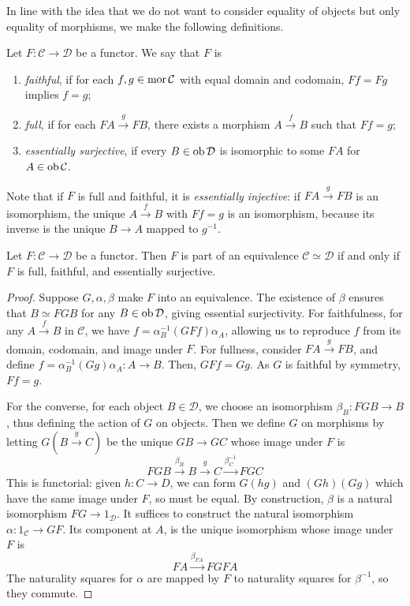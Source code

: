 In line with the idea that we do not want to consider equality of objects but only equality of morphisms, we make the following definitions.
\begin{definition}
    Let \( F : \mathcal C \to \mathcal D \) be a functor.
    We say that \( F \) is
    \begin{enumerate}
        \item \emph{faithful}, if for each \( f, g \in \operatorname{mor} \mathcal C \) with equal domain and codomain, \( Ff = Fg \) implies \( f = g \);
        \item \emph{full}, if for each \( FA \xrightarrow g FB \), there exists a morphism \( A \xrightarrow f B \) such that \( Ff = g \);
        \item \emph{essentially surjective}, if every \( B \in \operatorname{ob} \mathcal D \) is isomorphic to some \( FA \) for \( A \in \operatorname{ob} \mathcal C \).
    \end{enumerate}
\end{definition}
Note that if \( F \) is full and faithful, it is \emph{essentially injective}: if \( FA \xrightarrow g FB \) is an isomorphism, the unique \( A \xrightarrow f B \) with \( Ff = g \) is an isomorphism, because its inverse is the unique \( B \to A \) mapped to \( g^{-1} \).
\begin{lemma}
    Let \( F : \mathcal C \to \mathcal D \) be a functor.
    Then \( F \) is part of an equivalence \( \mathcal C \simeq \mathcal D \) if and only if \( F \) is full, faithful, and essentially surjective.
\end{lemma}
\begin{proof}
    Suppose \( G, \alpha, \beta \) make \( F \) into an equivalence.
    The existence of \( \beta \) ensures that \( B \simeq FGB \) for any \( B \in \operatorname{ob} \mathcal D \), giving essential surjectivity.
    For faithfulness, for any \( A \xrightarrow f B \) in \( \mathcal C \), we have \( f = \alpha_B^{-1} (GFf) \alpha_A \), allowing us to reproduce \( f \) from its domain, codomain, and image under \( F \).
    For fullness, consider \( FA \xrightarrow g FB \), and define \( f = \alpha_B^{-1} (Gg) \alpha_A : A \to B \).
    Then, \( GFf = Gg \).
    As \( G \) is faithful by symmetry, \( Ff = g \).

    For the converse, for each object \( B \in \mathcal D \), we choose an isomorphism \( \beta_B : FGB \to B \), thus defining the action of \( G \) on objects.
    Then we define \( G \) on morphisms by letting \( G(B \xrightarrow g C) \) be the unique \( GB \to GC \) whose image under \( F \) is
    \[ FGB \xrightarrow{\beta_B} B \xrightarrow g C \xrightarrow{\beta_C^{-1}} FGC \]
    This is functorial: given \( h : C \to D \), we can form \( G(hg) \) and \( (Gh)(Gg) \) which have the same image under \( F \), so must be equal.
    By construction, \( \beta \) is a natural isomorphism \( FG \to 1_{\mathcal D} \).
    It suffices to construct the natural isomorphism \( \alpha : 1_{\mathcal C} \to GF \).
    Its component at \( A \), is the unique isomorphism whose image under \( F \) is
    \[ FA \xrightarrow{\beta_{FA}} FGFA \]
    The naturality squares for \( \alpha \) are mapped by \( F \) to naturality squares for \( \beta^{-1} \), so they commute.
\end{proof}
